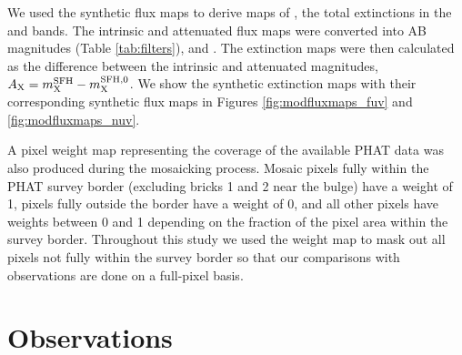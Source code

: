 \documentclass[iop, tighten]{emulateapj}
\begin{document}
We used the synthetic flux maps to derive maps of \ax{}, the total extinctions
in the \fuv{} and \nuv{} bands. The intrinsic and attenuated flux maps were
converted into AB magnitudes (Table \ref{tab:filters}), \xsfhz{} and \xsfh{}.
The extinction maps were then calculated as the difference between the
intrinsic and attenuated magnitudes, $A_{\mathrm{X}} = m_{\mathrm{X}}^{\mathrm{SFH}} - m_{\mathrm{X}}^{\mathrm{SFH},0}$. We show the
synthetic extinction maps with their corresponding synthetic flux maps in
Figures \ref{fig:modfluxmaps_fuv} and \ref{fig:modfluxmaps_nuv}.

A pixel weight map representing the coverage of the available PHAT data was
also produced during the mosaicking process. Mosaic pixels fully within the
PHAT survey border (excluding bricks 1 and 2 near the bulge) have a weight of
1, pixels fully outside the border have a weight of 0, and all other pixels
have weights between 0 and 1 depending on the fraction of the pixel area within
the survey border. Throughout this study we used the weight map to mask out all
pixels not fully within the survey border so that our comparisons with
observations are done on a full-pixel basis.

%
%





\section{Observations}\label{observations}
\end{document}
